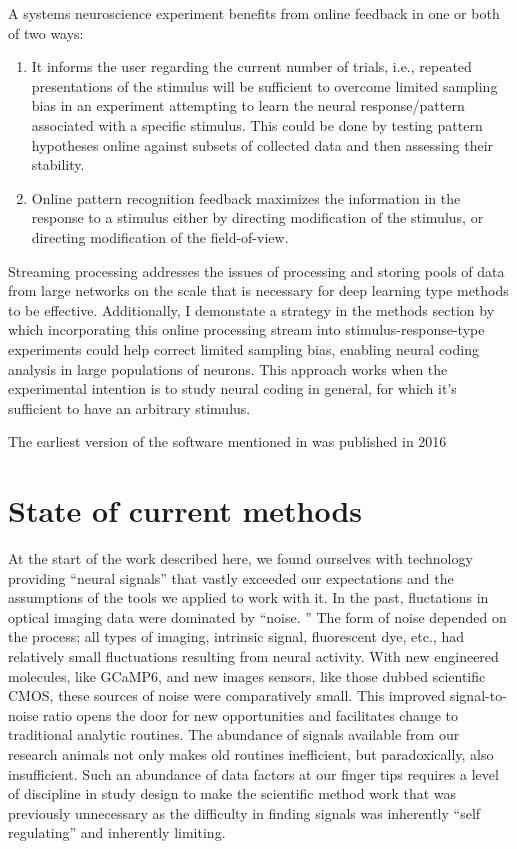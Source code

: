 A systems neuroscience experiment benefits from online feedback in one or both of two ways:

\begin{enumerate}
	\def\labelenumi{\arabic{enumi}.
	}
	\item
	      It informs the user regarding the current number of trials, i.e.,
	      repeated presentations of the stimulus will be sufficient to overcome
	      limited sampling bias in an experiment attempting to learn the neural
	      response/pattern associated with a specific stimulus.
	      This could be done by testing pattern hypotheses online against subsets of collected data and then assessing their stability.
	\item
	      Online pattern recognition feedback maximizes the information in the
	      response to a stimulus either by directing modification of the
	      stimulus, or directing modification of the field-of-view.
\end{enumerate}

Streaming processing addresses the issues of processing and storing pools of data from large networks on the scale that is necessary for deep learning type methods to be effective.
Additionally, I demonstate a strategy in the methods section by which incorporating this online processing stream into stimulus-response-type experiments could help correct limited sampling bias, enabling neural coding analysis in large populations of neurons.
This approach works when the experimental intention is to study neural coding in general, for which it's sufficient to have an arbitrary stimulus.




The earliest version of the software mentioned in  was published in 2016 \cite{Mohammed2016}

\section{State of current methods}\label{sec:state-of-current-methods}

At the start of the work described here, we found ourselves with technology providing “neural signals” that vastly exceeded our expectations and the assumptions of the tools we applied to work with it.
In the past, fluctations in optical imaging data were dominated by “noise.
” The form of noise depended on the process; all types of imaging, intrinsic signal, fluorescent dye, etc., had relatively small fluctuations resulting from neural activity.
With new engineered molecules, like GCaMP6, and new images sensors, like those dubbed scientific CMOS, these sources of noise were comparatively small.
This improved signal-to-noise ratio opens the door for new opportunities and facilitates change to traditional analytic routines.
The abundance of signals available from our research animals not only makes old routines inefficient, but paradoxically, also insufficient.
Such an abundance of data factors at our finger tips requires a level of discipline in study design to make the scientific method work that was previously unnecessary as the difficulty in finding signals was inherently “self regulating” and inherently limiting.

